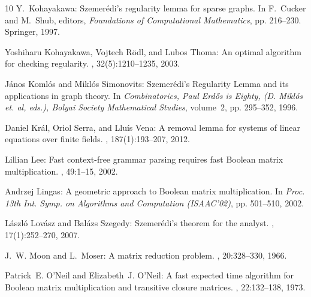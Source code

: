 \begin{thebibliography}{10}
{\sc Y.~Kohayakawa}: {Szemer\'{e}di's} regularity lemma for sparse graphs.
\newblock In {\sc F.~Cucker and M.~Shub}, editors, {\em Foundations of
  Computational Mathematics}, pp. 216--230. Springer, 1997.

{\sc Yoshiharu Kohayakawa, Vojtech R{\"o}dl, and Lubos Thoma}: An optimal
  algorithm for checking regularity.
, 32(5):1210--1235, 2003.
\newblock [\epfmtdoi{10.1137/S0097539702408223}]

{\sc J\'{a}nos Koml\'{o}s and Mikl\'{o}s Simonovits}: {S}zemer\'{e}di's
  {R}egularity {L}emma and its applications in graph theory.
\newblock In {\em Combinatorics, Paul Erd{\H o}s is Eighty, (D. Mikl{\'o}s et.
  al, eds.), Bolyai Society Mathematical Studies}, volume~2, pp. 295--352,
  1996.

{\sc Daniel Kr\'{a}l, Oriol Serra, and Llu\'{i}s Vena}: A removal lemma for
  systems of linear equations over finite fields.
, 187(1):193--207, 2012.
\newblock [\epfmtdoi{10.1007/s11856-011-0080-y}]

{\sc Lillian Lee}: Fast context-free grammar parsing requires fast {B}oolean
  matrix multiplication.
, 49:1--15, 2002.
\newblock [\epfmtdoi{10.1145/505241.505242}]

{\sc Andrzej Lingas}: A geometric approach to {B}oolean matrix multiplication.
\newblock In {\em Proc. 13th Int. Symp. on Algorithms and Computation
  (ISAAC'02)}, pp. 501--510, 2002.
\newblock [\epfmtdoi{10.1007/3-540-36136-7\_44}]

{\sc L\'{a}szl\'{o} Lov{\'a}sz and Bal\'{a}zs Szegedy}: {S}zemer\'{e}di's
  theorem for the analyst.
, 17(1):252--270, 2007.
\newblock [\epfmtdoi{10.1007/s00039-007-0599-6}]

{\sc J.~W. Moon and L.~Moser}: A matrix reduction problem.
, 20:328--330, 1966.
\newblock [\epfmtdoi{10.1090/S0025-5718-66-99935-2}]

{\sc Patrick~E. O'Neil and Elizabeth~J. O'Neil}: A fast expected time algorithm
  for {B}oolean matrix multiplication and transitive closure matrices.
, 22:132--138, 1973.
\newblock [\epfmtdoi{10.1016/S0019-9958(73)90228-3}]


\end{thebibliography}
